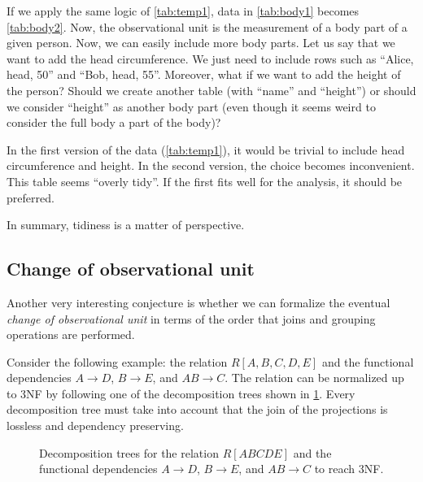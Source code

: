 If we apply the same logic of \cref{tab:temp1}, data in \cref{tab:body1} becomes
\cref{tab:body2}.  Now, the observational unit is the measurement of a body part of a
given person.  Now, we can easily include more body parts.  Let us say that we want to add
the head circumference.  We just need to include rows such as ``Alice, head, 50'' and
``Bob, head, 55''.  Moreover, what if we want to add the height of the person? Should we
create another table (with ``name'' and ``height'') or should we consider ``height''
as another body part (even though it seems weird to consider the full body a part of the
body)?

In the first version of the data (\cref{tab:temp1}), it would be trivial to include head
circumference and height.  In the second version, the choice becomes inconvenient.  This
table seems ``overly tidy''.  If the first fits well for the analysis, it should be
preferred.

In summary, tidiness is a matter of perspective.

\subsection{Change of observational unit}
\label{sub:change-unit}

Another very interesting conjecture is whether we can formalize the eventual \emph{change
of observational unit} in terms of the order that joins and grouping operations are
performed.

Consider the following example: the relation $R[A, B, C, D, E]$ and the functional
dependencies $A \to D$, $B \to E$, and $AB \to C$.  The relation can be normalized up to
3NF by following one of the decomposition trees shown in \cref{fig:decomp}.
Every decomposition tree must take into account that the join of the projections is
lossless and dependency preserving.

\begin{figure}
  \centering
  \caption{
    Decomposition trees for the relation $R[ABCDE]$ and the functional dependencies $A \to
    D$, $B \to E$, and $AB \to C$ to reach 3NF.
  }
  \label{fig:decomp}
\end{figure}


